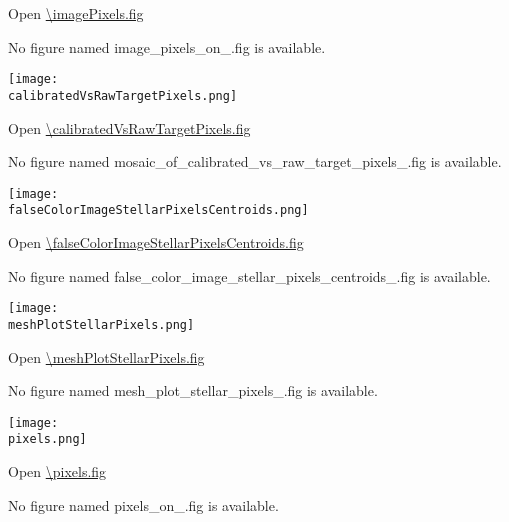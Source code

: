 \imagePixelsCaption

Open \url{\imagePixels.fig}

\else
No figure named image\_pixels\_on\_\channelSuffix.fig is available.
\fi

\clearpage
\ifdefined \calibratedVsRawTargetPixels

\begin{center}
  \texttt{[image: \\calibratedVsRawTargetPixels.png]}
\end{center}

\calibratedVsRawTargetPixelsCaption

Open \url{\calibratedVsRawTargetPixels.fig}

\else
No figure named
mosaic\_of\_calibrated\_vs\_raw\_target\_pixels\_\channelSuffix.fig is
available.
\fi

\clearpage
\ifdefined \falseColorImageStellarPixelsCentroids

\begin{center}
  \texttt{[image: \\falseColorImageStellarPixelsCentroids.png]}
\end{center}

\falseColorImageStellarPixelsCentroidsCaption

Open \url{\falseColorImageStellarPixelsCentroids.fig}

\else
No figure named
false\_color\_image\_stellar\_pixels\_centroids\_\channelSuffix.fig is
available.
\fi

\clearpage
\ifdefined \meshPlotStellarPixels

\begin{center}
  \texttt{[image: \\meshPlotStellarPixels.png]}
\end{center}

\meshPlotStellarPixelsCaption

Open \url{\meshPlotStellarPixels.fig}

\else
No figure named mesh\_plot\_stellar\_pixels\_\channelSuffix.fig is
available.
\fi

\vspace{5ex}

\ifdefined \pixels

\begin{center}
  \texttt{[image: \\pixels.png]}
\end{center}

\pixelsCaption

Open \url{\pixels.fig}

\else
No figure named pixels\_on\_\channelSuffix.fig is
available.
\fi

